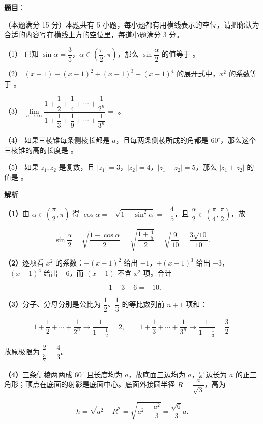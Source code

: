 \begin{answer}

\textbf{题目}：

（本题满分 15 分）本题共有 5 小题，每小题都有用横线表示的空位，请把你认为合适的内容写在横线上方的空位里，每道小题满分 3 分。

（1） 已知 $\sin\alpha=\dfrac35$，$\alpha\in\left(\dfrac{\pi}{2},\pi\right)$，那么 $\sin\dfrac{\alpha}{2}$ 的值等于 \gkblank{}。

（2） $(x-1)-(x-1)^2+(x-1)^3-(x-1)^4$ 的展开式中，$x^2$ 的系数等于 \gkblank{}。

（3） $\lim\limits_{n\to\infty}\dfrac{1+\dfrac12+\dfrac14+\cdots+\dfrac{1}{2^n}}{1+\dfrac13+\dfrac19+\cdots+\dfrac{1}{3^n}}=$ \gkblank{}。

（4） 如果三棱锥每条侧棱长都是 $a$，且每两条侧棱所成的角都是 $60^\circ$，那么这个三棱锥的高的长度是 \gkblank{}。

（5） 如果 $z_1,z_2$ 是复数，且 $|z_1|=3$，$|z_2|=4$，$|z_1-z_2|=5$，那么 $|z_1+z_2|$ 的值是 \gkblank{}。

\textbf{解析}

\textbf{（1）}由 $\alpha\in\left(\dfrac{\pi}{2},\pi\right)$ 得 $\cos\alpha=-\sqrt{1-\sin^2\alpha}=-\dfrac45$，且 $\dfrac{\alpha}{2}\in\left(\dfrac{\pi}{4},\dfrac{\pi}{2}\right)$，故

\nopagebreak[4]
\[
\sin\frac{\alpha}{2}=\sqrt{\frac{1-\cos\alpha}{2}}
=\sqrt{\frac{1+\frac45}{2}}
=\sqrt{\frac{9}{10}}
=\frac{3\sqrt{10}}{10}.
\]

\textbf{（2）}逐项看 $x^2$ 的系数：$-(x-1)^2$ 给出 $-1$，$+(x-1)^3$ 给出 $-3$，$-(x-1)^4$ 给出 $-6$，而 $(x-1)$ 不含 $x^2$ 项。合计

\nopagebreak[4]
\[
-1-3-6=-10.
\]

\textbf{（3）}分子、分母分别是公比为 $\dfrac12$、$\dfrac13$ 的等比数列前 $n+1$ 项和：

\nopagebreak[4]
\[
1+\frac12+\cdots+\frac{1}{2^n}\to\frac{1}{1-\frac12}=2,\qquad
1+\frac13+\cdots+\frac{1}{3^n}\to\frac{1}{1-\frac13}=\frac32.
\]

故原极限为 $\dfrac{2}{\frac32}=\dfrac43$。

\textbf{（4）}三条侧棱两两成 $60^\circ$ 且长度均为 $a$，故底面三边均为 $a$，是边长为 $a$ 的正三角形；顶点在底面的射影是底面中心。底面外接圆半径 $R=\dfrac{a}{\sqrt3}$，高为

\nopagebreak[4]
\[
h=\sqrt{a^2-R^2}=\sqrt{a^2-\frac{a^2}{3}}=\frac{\sqrt6}{3}a.
\]


\end{answer}
